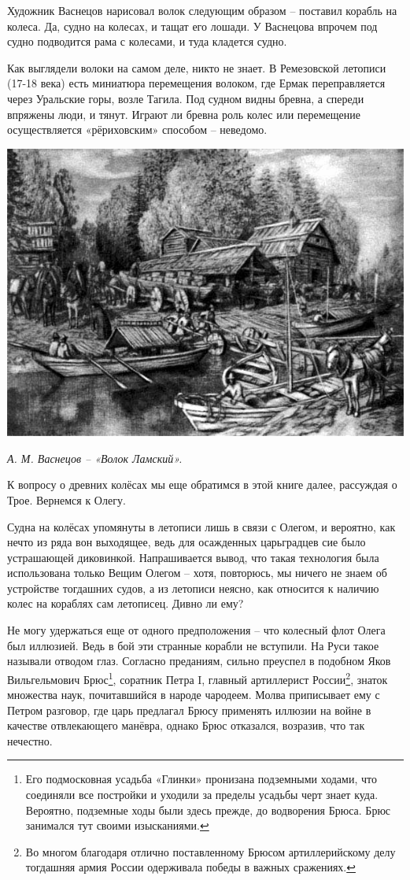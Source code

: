 Художник Васнецов нарисовал волок следующим образом – поставил корабль на колеса. Да, судно на колесах, и тащат его лошади. У Васнецова впрочем под судно подводится рама с колесами, и туда кладется судно.

Как выглядели волоки на самом деле, никто не знает. В Ремезовской летописи (17-18 века) есть миниатюра перемещения волоком, где Ермак переправляется через Уральские горы, возле Тагила. Под судном видны бревна, а спереди впряжены люди, и тянут. Играют ли бревна роль колес или перемещение осуществляется «рёриховским» способом – неведомо.

\begin{center}
\includegraphics[width=\linewidth]{chast-volga/olg/volok.jpg}

\textit{А. М. Васнецов – «Волок Ламский».}
\end{center}

К вопросу о древних колёсах мы еще обратимся в этой книге далее, рассуждая о Трое. Вернемся к Олегу. 

Судна на колёсах упомянуты в летописи лишь в связи с Олегом, и вероятно, как нечто из ряда вон выходящее, ведь для осажденных царьградцев сие было устрашающей диковинкой. Напрашивается вывод, что такая технология была использована только Вещим Олегом – хотя, повторюсь, мы ничего не знаем об устройстве тогдашних судов, а из летописи неясно, как относится к наличию колес на кораблях сам летописец. Дивно ли ему?

Не могу удержаться еще от одного предположения – что колесный флот Олега был иллюзией. Ведь в бой эти странные корабли не вступили. На Руси такое называли отводом глаз. Согласно преданиям, сильно преуспел в подобном Яков Вильгельмович Брюс\footnote{Его подмосковная усадьба «Глинки» пронизана подземными ходами, что соединяли все постройки и уходили за пределы усадьбы черт знает куда. Вероятно, подземные ходы были здесь прежде, до водворения Брюса. Брюс занимался тут своими изысканиями.}, соратник Петра I, главный артиллерист России\footnote{Во многом благодаря отлично поставленному Брюсом артиллерийскому делу тогдашняя армия России одерживала победы в важных сражениях.}, знаток множества наук, почитавшийся в народе чародеем. Молва приписывает ему с Петром разговор, где царь предлагал Брюсу применять иллюзии на войне в качестве отвлекающего манёвра, однако Брюс отказался, возразив, что так нечестно. 

